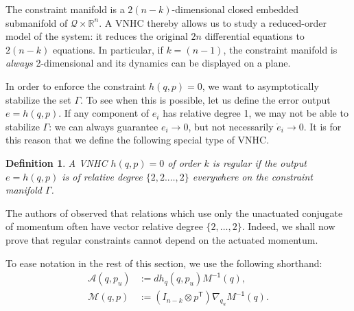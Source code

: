 \documentclass[journal,twoside,web, twocolumn,draftcls]{ieeecolor}
\newtheorem{defn}{Definition} %
\newcommand*{\tpose}{^\mathsf{T}}
\newcommand*{\R}{\mathbb{R}}
\newcommand*{\Minv}{M^\mathsf{-1}}
\newcommand*{\Id}[1]{I_{#1}}
\begin{document}
The constraint manifold is a \(2(n-k)\)-dimensional
closed embedded submanifold of \(\mathcal{Q} \times \R^n\).
A VNHC thereby allows us to study a reduced-order model of the system: it reduces
the original \(2n\) differential equations to \(2(n-k)\) equations.
In particular, if \(k = (n-1)\), the constraint manifold is \textit{always}
2-dimensional and its dynamics can be displayed on a plane. 

In order to enforce the constraint \(h(q,p) = 0\), we want to asymptotically
stabilize the set \(\Gamma\).
To see when this is possible, let us define the error output \(e = h(q,p)\).
If any component of \(e_i\) has relative degree 1, we may not be able
to stabilize \(\Gamma\): we can always guarantee \(e_i \to 0\), but not
necessarily \(\dot{e}_i \to 0\).
It is for this reason that we define the following special type of VNHC.

\begin{defn}
    A VNHC \(h(q,p) = 0\) of order \(k\) is \textit{regular} if the output 
    \(e = h(q,p)\) is of relative degree \(\{2,2.\ldots,2\}\) everywhere on the
    constraint manifold \(\Gamma\).
\end{defn}

The authors of
\cite{nhvc_dynamic_walking,hybrid_zero_dynamics_bipedal_nhvcs}
observed that relations which use only the unactuated conjugate of momentum
often have vector relative degree \(\{2,\ldots,2\}\).
Indeed, we shall now prove that regular constraints cannot depend on the
actuated momentum.

To ease notation in the rest of this section, we use the following shorthand:
\begin{align}
    \mathcal{A}(q,p_u) &:= dh_q(q,p_u) \Minv(q) 
        ,\\
    \mathcal{M}(q,p) &:= (\Id{n-k} \otimes p\tpose)\nabla_{q_u}\Minv(q) 
    .
\end{align}
\end{document}

